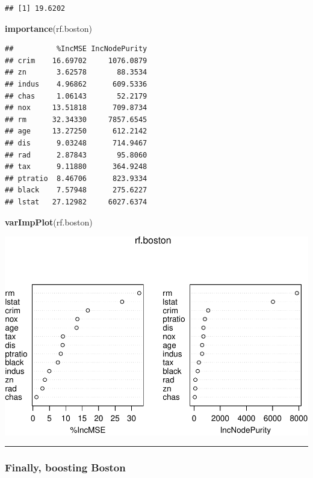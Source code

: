 \documentclass[]{article}
\newenvironment{Shaded}{\begin{snugshade}}{\end{snugshade}}
\newcommand{\KeywordTok}[1]{\textcolor[rgb]{0.13,0.29,0.53}{\textbf{#1}}}
\newcommand{\NormalTok}[1]{#1}
\begin{document}
\begin{verbatim}
## [1] 19.6202
\end{verbatim}

\begin{Shaded}
\begin{Highlighting}[]
\KeywordTok{importance}\NormalTok{(rf.boston)}
\end{Highlighting}
\end{Shaded}

\begin{verbatim}
##          %IncMSE IncNodePurity
## crim    16.69702     1076.0879
## zn       3.62578       88.3534
## indus    4.96862      609.5336
## chas     1.06143       52.2179
## nox     13.51818      709.8734
## rm      32.34330     7857.6545
## age     13.27250      612.2142
## dis      9.03248      714.9467
## rad      2.87843       95.8060
## tax      9.11880      364.9248
## ptratio  8.46706      823.9334
## black    7.57948      275.6227
## lstat   27.12982     6027.6374
\end{verbatim}

\begin{Shaded}
\begin{Highlighting}[]
\KeywordTok{varImpPlot}\NormalTok{(rf.boston)}
\end{Highlighting}
\end{Shaded}

\includegraphics{8Trees_files/figure-latex/unnamed-chunk-46-1.pdf}

\begin{center}\rule{0.5\linewidth}{\linethickness}\end{center}

\hypertarget{finally-boosting-boston}{%
\subsubsection{Finally, boosting Boston}\label{finally-boosting-boston}}
\end{document}

